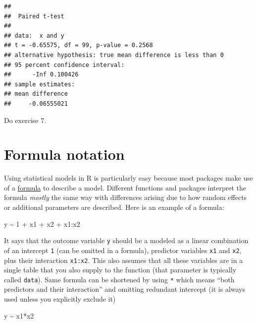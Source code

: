 \documentclass[
]{book}
\newenvironment{Shaded}{\begin{snugshade}}{\end{snugshade}}
\newcommand{\DecValTok}[1]{\textcolor[rgb]{0.00,0.00,0.81}{#1}}
\newcommand{\NormalTok}[1]{#1}
\newcommand{\SpecialCharTok}[1]{\textcolor[rgb]{0.00,0.00,0.00}{#1}}
\begin{document}
\begin{verbatim}
## 
##  Paired t-test
## 
## data:  x and y
## t = -0.65575, df = 99, p-value = 0.2568
## alternative hypothesis: true mean difference is less than 0
## 95 percent confidence interval:
##      -Inf 0.100426
## sample estimates:
## mean difference 
##     -0.06555021
\end{verbatim}

Do exercise 7.

\hypertarget{formula-notation}{%
\section{Formula notation}\label{formula-notation}}

Using statistical models in R is particularly easy because most packages make use of a \href{https://stat.ethz.ch/R-manual/R-devel/library/stats/html/formula.html}{formula} to describe a model. Different functions and packages interpret the formula \emph{mostly} the same way with differences arising due to how random effects or additional parameters are described. Here is an example of a formula:

\begin{Shaded}
\begin{Highlighting}[]
\NormalTok{y }\SpecialCharTok{\textasciitilde{}} \DecValTok{1} \SpecialCharTok{+}\NormalTok{ x1 }\SpecialCharTok{+}\NormalTok{ x2 }\SpecialCharTok{+}\NormalTok{ x1}\SpecialCharTok{:}\NormalTok{x2}
\end{Highlighting}
\end{Shaded}

It says that the outcome variable \texttt{y} should be a modeled as a linear combination of an intercept \texttt{1} (can be omitted in a formula), predictor variables \texttt{x1} and \texttt{x2}, plus their interaction \texttt{x1:x2}. This also assumes that all these variables are in a single table that you also supply to the function (that parameter is typically called \texttt{data}). Same formula can be shortened by using \texttt{*} which means ``both predictors and their interaction'' and omitting redundant intercept (it is always used unless you explicitly exclude it)

\begin{Shaded}
\begin{Highlighting}[]
\NormalTok{y }\SpecialCharTok{\textasciitilde{}}\NormalTok{ x1}\SpecialCharTok{*}\NormalTok{x2}
\end{Highlighting}
\end{Shaded}
\end{document}

